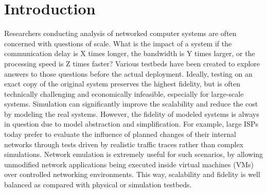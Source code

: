 \section{Introduction}
\label{Sec-Intro}

Researchers conducting analysis of networked computer systems are often concerned with questions of scale. What is the impact of a system if the communication delay is X times longer, the bandwidth is Y times larger, or the processing speed is Z times faster? 
Various testbeds have been created to explore answers to those questions before the actual deployment. Ideally, testing on an exact copy of the original system preserves the highest fidelity, but is often technically challenging and economically infeasible, especially for large-scale systems. 
Simulation can significantly improve the scalability and reduce the cost by modeling the real systems. However, the fidelity of modeled systems is always in question due to model abstraction and simplification. 
For example, large ISPs today prefer to evaluate the influence of planned changes of their internal networks through tests driven by realistic traffic traces rather than complex simulations. 
Network emulation is extremely useful for such scenarios, by allowing unmodified network applications being executed inside virtual machines (VMs) over controlled networking environments. This way, scalability and fidelity is well balanced as compared with physical or simulation testbeds.

